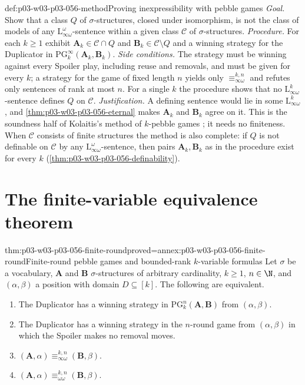 \begin{hbmethod}{def:p03-w03-p03-056-method}{Proving inexpressibility with pebble games}
\emph{Goal.} Show that a class \(Q\) of \(\sigma\)-structures, closed under
isomorphism, is not the class of models of any
\(\mathrm{L}^\omega_{\infty\omega}\)-sentence within a given class
\(\mathcal C\) of \(\sigma\)-structures.
\emph{Procedure.} For each \(k\geq1\) exhibit
\(\mathbf A_k\in\mathcal C\cap Q\) and \(\mathbf B_k\in\mathcal C\setminus Q\)
and a winning strategy for the Duplicator in
\(\mathrm{PG}^\infty_k(\mathbf A_k,\mathbf B_k)\).
\emph{Side conditions.} The strategy must be winning against every Spoiler
play, including reuse and removals, and must be given for every \(k\); a
strategy for the game of fixed length \(n\) yields only
\(\equiv^{k,n}_{\infty\omega}\) and refutes only sentences of rank at most
\(n\). For a single \(k\) the procedure shows that no
\(\mathrm{L}^k_{\infty\omega}\)-sentence defines \(Q\) on \(\mathcal C\).
\emph{Justification.} A defining sentence would lie in some
\(\mathrm{L}^k_{\infty\omega}\), and \cref{thm:p03-w03-p03-056-eternal} makes
\(\mathbf A_k\) and \(\mathbf B_k\) agree on it. This is the soundness half
of Kolaitis's method of \(k\)-pebble games
\cite[Method~7.11, pp.~59--60]{Kolaitis2003ExpressivePowerNotes}; it
needs no finiteness. When \(\mathcal C\) consists of finite structures the
method is also complete: if \(Q\) is not definable on \(\mathcal C\) by any
\(\mathrm{L}^\omega_{\infty\omega}\)-sentence, then pairs
\(\mathbf A_k,\mathbf B_k\) as in the procedure exist for every \(k\)
(\cref{thm:p03-w03-p03-056-definability}).
\end{hbmethod}

\section{The finite-variable equivalence theorem}
\label{sec:p03-w03-p03-056-theorem}

\begin{hbtheorem}{thm:p03-w03-p03-056-finite-round}{proved=annex:p03-w03-p03-056-finite-round}{Finite-round pebble games and bounded-rank \(k\)-variable formulas}
Let \(\sigma\) be a vocabulary, \(\mathbf A\) and \(\mathbf B\)
\(\sigma\)-structures of arbitrary cardinality, \(k\geq1\), \(n\in\N\), and
\((\alpha,\beta)\) a position with domain \(D\subseteq[k]\). The following
are equivalent.
\begin{enumerate}
\item The Duplicator has a winning strategy in
      \(\mathrm{PG}^n_k(\mathbf A,\mathbf B)\) from \((\alpha,\beta)\).
\item The Duplicator has a winning strategy in the \(n\)-round game from
      \((\alpha,\beta)\) in which the Spoiler makes no removal moves.
\item \((\mathbf A,\alpha)\equiv^{k,n}_{\infty\omega}(\mathbf B,\beta)\).
\item \((\mathbf A,\alpha)\equiv^{k,n}_{\omega\omega}(\mathbf B,\beta)\).
\end{enumerate}
\end{hbtheorem}

